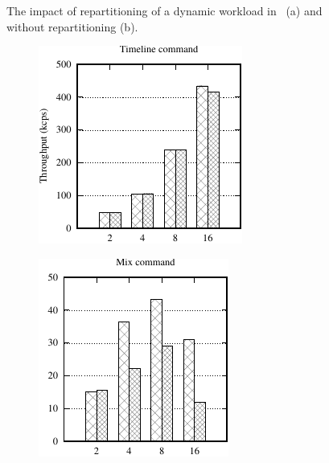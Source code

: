 \begin{figure}[h!]
\begin{subfigure}{.49\textwidth}
    \caption{}
  \end{subfigure}
  \caption{The impact of repartitioning of a dynamic workload in \dynastar~(a) and \ssmr without repartitioning (b).}%
  \label{fig:socialcelebrity}
\end{figure}

\begin{figure}[h!]
  \centering
  \begin{subfigure}{.4\textwidth}
    \centering
    \includegraphics[width=\textwidth]{./figures/eurosys/chirper-compare-timeline-tp.pdf}
  \end{subfigure}
  \begin{subfigure}{.38\textwidth}
    \centering
    \includegraphics[width=\textwidth]{./figures/eurosys/chirper-compare-mix-tp.pdf}

\end{subfigure}
\end{figure}
